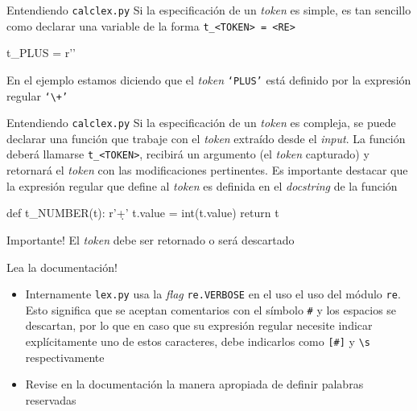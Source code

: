\documentclass[pdf]{beamer}
\begin{document}
\begin{frame}[fragile]{Entendiendo \texttt{calclex.py}}
	Si la especificación de un \emph{token} es simple, es tan sencillo como declarar una variable de la forma \texttt{t\_<TOKEN> = <RE>}
	
\begin{example}
\begin{python}
t_PLUS = r'\+'
\end{python}
\end{example}

	En el ejemplo estamos diciendo que el \emph{token} \texttt{`PLUS'} está definido por la expresión regular \texttt{`\textbackslash+'}
\end{frame}

\begin{frame}[fragile]{Entendiendo \texttt{calclex.py}}
	Si la especificación de un \emph{token} es compleja, se puede declarar una función que trabaje con el \emph{token} extraído desde el \emph{input}. La función deberá llamarse \texttt{t\_<TOKEN>}, recibirá un argumento (el \emph{token} capturado) y retornará el \emph{token} con las modificaciones pertinentes. Es importante destacar que la expresión regular que define al \emph{token} es definida en el \emph{docstring} de la función
	
\begin{example}
\begin{python}
def t_NUMBER(t):
    r'\d+'
    t.value = int(t.value)
    return t
\end{python}	
\end{example}

\begin{alertblock}{Importante!}
El \emph{token} debe ser retornado o será descartado
\end{alertblock}

\end{frame}

\begin{frame}{Lea la documentación!}
\begin{itemize}
	\item Internamente \texttt{lex.py} usa la \emph{flag} \texttt{re.VERBOSE} en el uso el uso del módulo \texttt{re}. Esto significa que se aceptan comentarios con el símbolo \texttt{\#} y los espacios se descartan, por lo que en caso que su expresión regular necesite indicar explícitamente uno de estos caracteres, debe indicarlos como \texttt{[\#]} y \texttt{\textbackslash s} respectivamente

	\item Revise en la documentación la manera apropiada de definir palabras reservadas
\end{itemize}

\end{frame}
\end{document}
